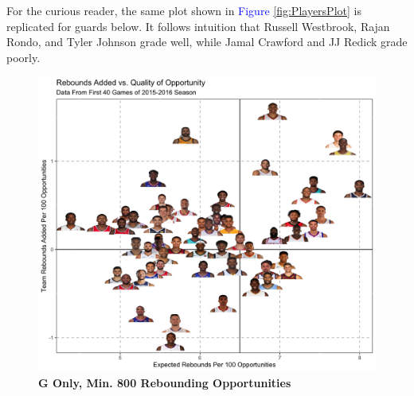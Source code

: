 \documentclass{article}
\begin{document}
\bigbreak
\noindent
For the curious reader, the same plot shown in \textcolor{blue}{Figure} \ref{fig:PlayersPlot}  is replicated for guards below. It follows intuition that Russell Westbrook, Rajan Rondo, and Tyler Johnson grade well, while Jamal Crawford and JJ Redick grade poorly.

\begin{figure}[htb]
\centering
\includegraphics[width=.85\columnwidth]{GuardsPlot2.jpg}
\caption{\bf{G Only, Min. 800 Rebounding Opportunities}}
\label{fig:GuardsPlot}
\end{figure}
\end{document}
